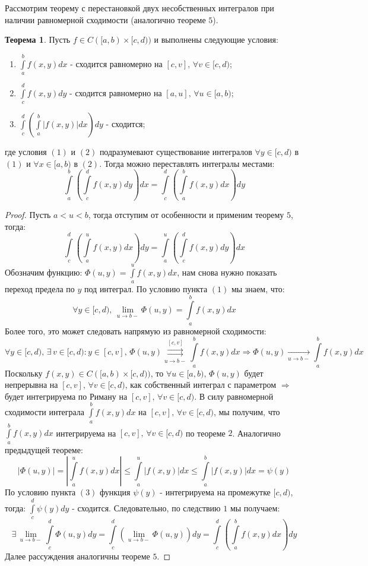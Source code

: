 \documentclass[12pt]{article}
\theoremstyle{definition}
\newtheorem{theorem}{Теорема}
\newcommand{\ddint}[2]{\displaystyle\int\limits_{#1}^{#2}}
\newcommand{\uconvm}[2]{\overset{#1}{\underset{#2}{\rightrightarrows}}}
\begin{document}
Рассмотрим теорему с перестановкой двух несобственных интегралов при наличии равномерной сходимости (аналогично теореме $5$).
\begin{theorem}
	Пусть $f \in C([a,b)\times [c,d))$ и выполнены следующие условия:
	\begin{enumerate}[label=(\arabic*)]
		\item $\ddint{a}{b}f(x,y)dx$ - сходится равномерно на $[c,v], \, \forall v \in [c,d)$;
		\item $\ddint{c}{d}f(x,y)dy$ - сходится равномерно на $[a,u], \, \forall u \in [a,b)$;
		\item $\ddint{c}{d}\left(\ddint{a}{b}|f(x,y)|dx\right)dy$ - сходится;
	\end{enumerate}
	где условия $(1)$ и $(2)$ подразумевают существование интегралов $\forall y \in [c,d)$ в $(1)$ и $\forall x\in [a,b)$ в $(2)$. Тогда можно переставлять интегралы местами:
	$$
		\ddint{a}{b}\left(\ddint{c}{d}f(x,y)dy\right)dx = \ddint{c}{d}\left(\ddint{a}{b}f(x,y)dx\right)dy
	$$
\end{theorem}
\begin{proof}
	Пусть $a < u < b$, тогда отступим от особенности и применим теорему $5$, тогда:
	$$
		\ddint{c}{d}\left(\ddint{a}{u}f(x,y)dx\right)dy = \ddint{a}{u}\left(\ddint{c}{d}f(x,y)dy\right)dx
	$$
	Обозначим функцию: $\Phi(u,y) = \ddint{a}{u}f(x,y)dx$, нам снова нужно показать переход предела по $y$ под интеграл. По условию пункта $(1)$ мы знаем, что:
	$$
		\forall y \in [c,d), \, \lim\limits_{u \to b-}\Phi(u,y) = \ddint{a}{b}f(x,y)dx
	$$
	Более того, это может следовать напрямую из равномерной сходимости:
	$$
		\forall y \in [c,d), \, \exists \, v \in [c,d) \colon y \in [c,v], \, \Phi(u,y)\uconvm{[c,v]}{u \to b-} \ddint{a}{b}f(x,y)dx \Rightarrow \Phi(u,y) \xrightarrow[u \to b-]{} \ddint{a}{b}f(x,y)dx
	$$
	Поскольку $f(x,y) \in C([a,b)\times[c,d))$, то $\forall u \in [a,b), \, \Phi(u,y)$ будет непрерывна на $[c,v], \, \forall v \in [c,d)$, как собственный интеграл с параметром $\Rightarrow$ будет интегрируема по Риману на $[c,v], \, \forall v \in [c,d)$. В силу равномерной сходимости интеграла $\ddint{a}{b}f(x,y)dx$ на $[c,v], \, \forall v \in [c,d)$, мы получим, что $\ddint{a}{b}f(x,y)dx$ интегрируема на $[c,v], \, \forall v \in [c,d)$ по теореме $2$. Аналогично предыдущей теореме:
	$$
		|\Phi(u,y)|= \left|\ddint{a}{u}f(x,y)dx\right| \leq \ddint{a}{u}|f(x,y)|dx \leq \ddint{a}{b}|f(x,y)|dx = \psi(y)
	$$
	По условию пункта $(3)$ функция $\psi(y)$ - интегрируема на промежутке $[c,d)$, тогда: $\ddint{c}{d}\psi(y)dy$ - сходится. Следовательно, по следствию $1$ мы получаем:
	$$
		\exists \, \lim\limits_{u \to b-}\ddint{c}{d}\Phi(u,y)dy = \ddint{c}{d}\left(\lim\limits_{u \to b-}\Phi(u,y)\right)dy = \ddint{c}{d}\left(\ddint{a}{b}f(x,y)dx\right)dy
	$$
	Далее рассуждения аналогичны теореме $5$.
\end{proof}
\end{document}
